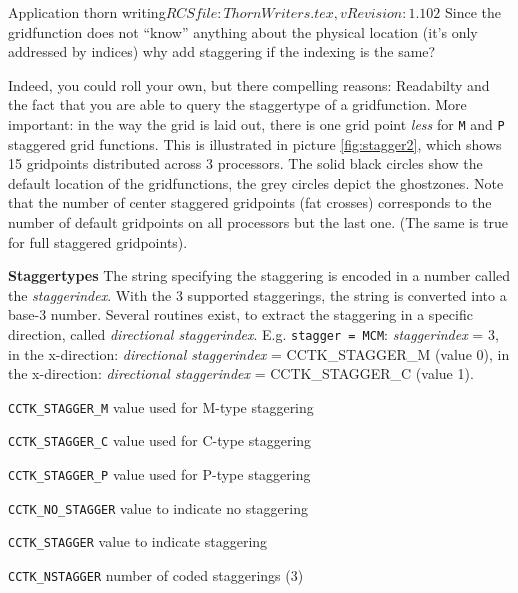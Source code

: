 \begin{cactuspart}{2}{Application thorn writing}{$RCSfile: ThornWriters.tex,v $}{$Revision: 1.102 $}
Since the gridfunction does not ``know'' anything about the physical
location (it's only addressed by indices) why add staggering if the
indexing is the same?

Indeed, you could roll your own, but there compelling reasons:
Readabilty and the fact that you are able to query the staggertype of a
gridfunction. More important: in the way the grid is laid out, there is one grid
point {\em less} for {\tt M} and {\tt P} staggered grid functions. This is
illustrated in picture \ref{fig:stagger2}, which shows 15 gridpoints distributed
across 3 processors. The solid black circles show the default
location of the gridfunctions, the grey circles depict the ghostzones.
Note that the number of center staggered gridpoints (fat crosses)
corresponds to the number of default gridpoints on all processors but
the last one. (The same is true for full staggered gridpoints).

{\bf Staggertypes}
The string specifying the staggering is encoded in a number called
the {\em staggerindex}. With the 3 supported staggerings, the string
is converted into a base-3 number. Several routines exist, to extract the
staggering in a specific direction, called {\em directional
staggerindex}. E.g. {\tt stagger = MCM}: {\em staggerindex} = 3, in the
x-direction: {\em directional staggerindex} = CCTK\_STAGGER\_M (value 0),  in the
x-direction: {\em directional staggerindex} = CCTK\_STAGGER\_C (value 1).

\begin{Lentry}
\item[{\tt CCTK\_STAGGER\_M}]  value used for M-type staggering
\item[{\tt CCTK\_STAGGER\_C}]  value used for C-type staggering
\item[{\tt CCTK\_STAGGER\_P}]  value used for P-type staggering
\item[{\tt CCTK\_NO\_STAGGER}] value to indicate no staggering
\item[{\tt CCTK\_STAGGER}]    value to indicate staggering
\item[{\tt CCTK\_NSTAGGER}]   number of coded staggerings (3)
\end{Lentry}



\end{cactuspart}
